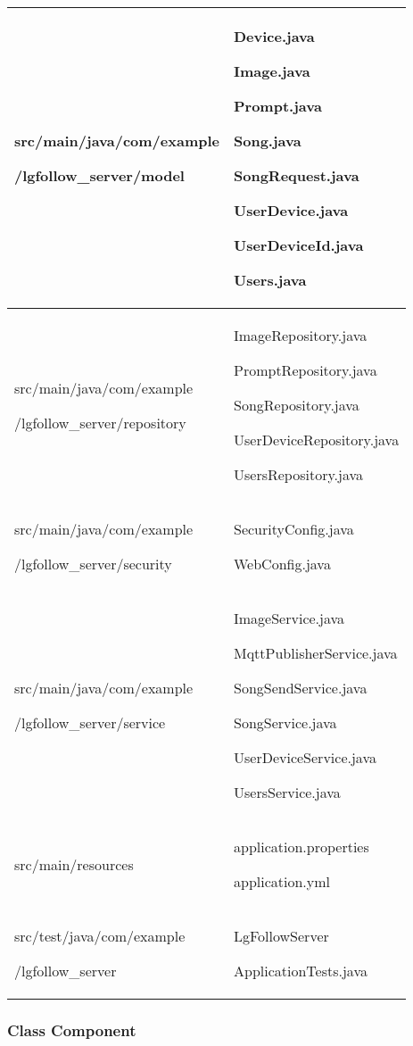 \documentclass[conference]{IEEEtran}
\begin{document}
\begin{table}[h!]
\begin{tabular}{|p{4.1cm}|p{4.1cm}|}
        src/main/java/com/example \par /lgfollow\_server/model & Device.java \par Image.java \par Prompt.java \par Song.java \par SongRequest.java \par UserDevice.java \par UserDeviceId.java \par Users.java \\ \hline
        src/main/java/com/example \par /lgfollow\_server/repository & ImageRepository.java \par PromptRepository.java \par SongRepository.java \par UserDeviceRepository.java \par UsersRepository.java \\ \hline
        src/main/java/com/example\par /lgfollow\_server/security & SecurityConfig.java \par WebConfig.java \\ \hline
        src/main/java/com/example \par /lgfollow\_server/service & ImageService.java \par MqttPublisherService.java \par SongSendService.java \par SongService.java \par UserDeviceService.java \par UsersService.java \\ \hline
        src/main/resources & application.properties \par application.yml \\ \hline
        src/test/java/com/example \par /lgfollow\_server & LgFollowServer\par ApplicationTests.java \\ \hline
    \end{tabular}
\end{table}


\subsubsection{Class Component}
\end{document}
